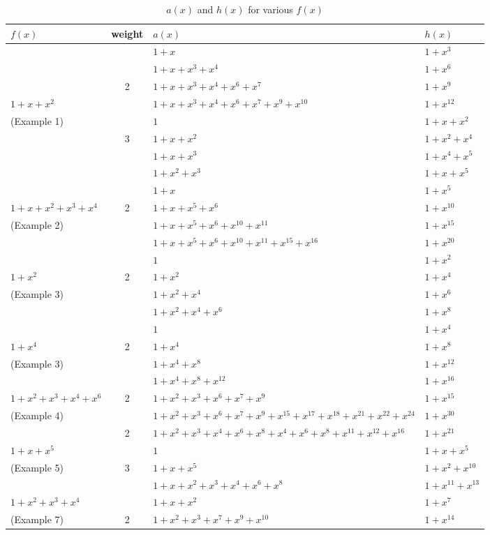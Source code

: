 \begin{table}[htbp]
\caption{$a(x)$ and $h(x)$ for various $f(x)$}
\centering
\begin{tabularx}{0.7\textwidth}{l|cXl} 
\toprule
$f(x)$ & weight & $a(x)$ & $h(x)$\\
\midrule
 &  & $1+x$ & $1+x^{3}$ \\
&  &$1+x+x^3+x^4$ & $1+x^{6}$  \\
& 2 &$1+x+x^3+x^4+x^6+x^{7}$ &  $1+x^{9}$ \\
$1+x+x^2$&& $1+x+x^3+x^4+x^6+x^{7}+x^9+x^{10}$&  $1+x^{12}$ \\
\cline{2-4}
(Example 1)& &$1$ & $1+x+x^2$\\ 
& 3&$1+x+x^2$ &  $1+x^2+x^4$\\
& &$1+x+x^3$ & $1+x^4+x^5$\\
& &$1+x^2+x^3$ & $1+x+x^5$ \\
\cline{1-4}
&&$1+x$ &$1+x^5$\\ 
$1+x+x^2+x^3+x^4$&2&$1+x+x^5+x^6$ &$1+x^{10}$  \\
(Example 2)&&$1+x+x^5+x^6+x^{10}+x^{11}$ & $1+x^{15}$ \\
&&$1+x+x^5+x^6+x^{10}+x^{11}+x^{15}+x^{16}$ &$1+x^{20}$  \\
\cline{1-4}
&&$1$ & $1+x^2$\\ 
$1+x^2$&2&$1+x^2$ & $1+x^4$ \\
(Example 3)&&$1+x^2+x^4$ & $1+x^6$\\
&&$1+x^2+x^4+x^6$ & $1+x^8$\\
\cline{1-4}
&&$1$ & $1+x^4$\\ 
$1+x^4$&2&$1+x^4$ & $1+x^8$ \\
(Example 3)&&$1+x^4+x^8$ & $1+x^{12}$\\
&&$1+x^4+x^8+x^12$ & $1+x^{16}$\\
\cline{1-4}
$1+x^2+x^3+x^4+x^6$&2&$1+x^2+x^3+x^6+x^7+x^9$ & $1+x^{15}$\\ 
(Example 4)&&$1+x^2+x^3+x^6+x^7+x^9+x^{15}+x^{17}+x^{18}+x^{21}+x^{22}+x^{24}$ & $1+x^{30}$ \\
\cline{1-4}
&2&$1+x^2+x^3+x^4+x^6+x^8+x^{4}+x^{6}+x^{8}+x^{11}+x^{12}+x^{16}$ &  $1+x^{21}$\\
\cline{2-4}
$1+x+x^5$&&$1$ & $1+x+x^{5}$\\ 
(Example 5)&3&$1+x+x^5$ &  $1+x^2+x^{10}$\\
&&$1+x+x^2+x^3+x^4+x^{6}+x^{8}$ & $1+x^{11}+x^{13}$\\
\cline{1-4}
$1+x^2+x^3+x^4$&&$1+x+x^2$& $1+x^{7}$ \\
(Example 7)&2&$1+x^2+x^3+x^7+x^9+x^{10}$	& $1+x^{14}$ \\
\bottomrule
\end{tabularx}
\label{examples-table}
\end{table}






